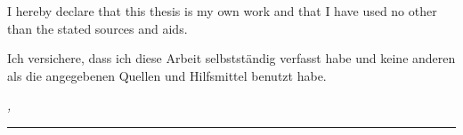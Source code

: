 %
\label{sec:declaration}
\thispagestyle{empty}

I hereby declare that this thesis is my own work and that I have used no other than the stated sources and aids.

Ich versichere, dass ich diese Arbeit selbstständig verfasst habe und keine anderen als die angegebenen Quellen und Hilfsmittel benutzt habe.

\bigskip

\noindent\textit{\thesisUniversityCity, \thesisDate}

\smallskip

\begin{flushright}
	\begin{minipage}{5cm}
		\rule{\textwidth}{1pt}
		\centering\thesisName
	\end{minipage}
\end{flushright}

